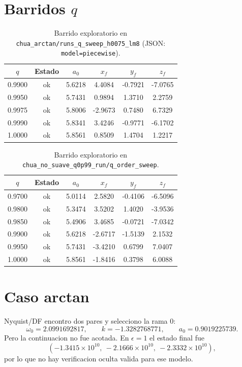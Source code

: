 \documentclass[11pt]{article}
\newcommand{\pathcell}[1]{\texttt{\footnotesize #1}}
\begin{document}
\section*{Barridos \(q\)}

\begin{table}[H]
\centering
\caption{Barrido exploratorio en \pathcell{chua\_arctan/runs\_q\_sweep\_h0075\_lm8} (JSON: \pathcell{model=piecewise}).}
\scriptsize
\begin{tabular}{cccccc}
\toprule
\(q\) & Estado & \(a_0\) & \(x_f\) & \(y_f\) & \(z_f\) \\
\midrule
0.9900 & ok & 5.6218 & 4.4084 & -0.7921 & -7.0765 \\
0.9950 & ok & 5.7431 & 0.9894 & 1.3710 & 2.2759 \\
0.9975 & ok & 5.8006 & -2.9673 & 0.7480 & 6.7329 \\
0.9990 & ok & 5.8341 & 3.4246 & -0.9771 & -6.1702 \\
1.0000 & ok & 5.8561 & 0.8509 & 1.4704 & 1.2217 \\
\bottomrule
\end{tabular}
\end{table}

\begin{table}[H]
\centering
\caption{Barrido exploratorio en \pathcell{chua\_no\_suave\_q0p99\_run/q\_order\_sweep}.}
\scriptsize
\begin{tabular}{cccccc}
\toprule
\(q\) & Estado & \(a_0\) & \(x_f\) & \(y_f\) & \(z_f\) \\
\midrule
0.9700 & ok & 5.0114 & 2.5820 & -0.4106 & -6.5096 \\
0.9800 & ok & 5.3474 & 3.5202 & 1.4020 & -3.9536 \\
0.9850 & ok & 5.4906 & 3.4685 & -0.0721 & -7.0342 \\
0.9900 & ok & 5.6218 & -2.6717 & -1.5139 & 2.1532 \\
0.9950 & ok & 5.7431 & -3.4210 & 0.6799 & 7.0407 \\
1.0000 & ok & 5.8561 & -1.8416 & 0.3798 & 6.0088 \\
\bottomrule
\end{tabular}
\end{table}

\section*{Caso arctan}

Nyquist/DF encontro dos pares y selecciono la rama 0:
\[
\omega_0=2.0991692817,\qquad k=-1.3282768771,\qquad a_0=0.9019225739.
\]
Pero la continuacion no fue acotada. En \(\epsilon=1\) el estado final fue
\[
(-1.3415{\times}10^{10},\ -2.1666{\times}10^{10},\
-2.3332{\times}10^{10}),
\]
por lo que no hay verificacion oculta valida para ese modelo.
\end{document}
